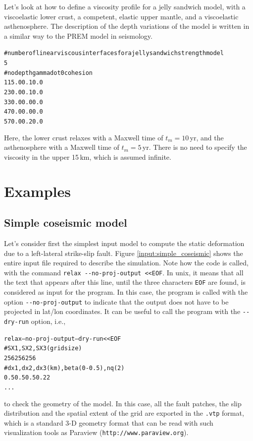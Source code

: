 \documentclass[10pt]{article}
\begin{document}
Let's look at how to define a viscosity profile for a jelly sandwich model, with a viscoelastic lower crust, a competent, elastic upper mantle, and a viscoelastic asthenosphere. The description of the depth variations of the model is written in a similar way to the PREM model in seismology.
\begin{alltt}
# number of linear viscous interfaces for a jelly sandwich strength model
{\color{orange}5}
# no depth gammadot0 cohesion
{\color{orange}   1  15.0       0.1      0.0}
{\color{orange}   2  30.0       0.1      0.0}
{\color{orange}   3  30.0       0.0      0.0}
{\color{orange}   4  70.0       0.0      0.0}
{\color{orange}   5  70.0       0.2      0.0}
\end{alltt}
Here, the lower crust relaxes with a Maxwell time of $t_m=10\,$yr, and the asthenosphere with a Maxwell time of $t_m=5\,$yr. There is no need to specify the viscosity in the upper 15\,km, which is assumed infinite.


\section{Examples}

\subsection{Simple coseismic model}

Let's consider first the simplest input model to compute the static deformation due to a left-lateral strike-slip fault. Figure \ref{input:simple_coseismic} shows the entire input file required to describe the simulation. Note how the code is called, with the command \verb'relax --no-proj-output <<EOF'. In unix, it means that all the text that appears after this line, until the three characters \verb'EOF' are found, is considered as input for the program. In this case, the program is called with the option \verb'--no-proj-output' to indicate that the output does not have to be projected in lat/lon coordinates. It can be useful to call the program with the \verb'--dry-run' option, i.e.,
\begin{alltt}
relax --no-proj-output {\color{orange}--dry-run} <<EOF
# SX1,SX2,SX3 (grid size)
256 256 256
# dx1,dx2,dx3 (km),beta (0-0.5),nq (2)
0.5 0.5 0.5 0.2 2
...
\end{alltt}
to check the geometry of the model. In this case, all the fault patches, the slip distribution and the spatial extent of the grid are exported in the \verb'.vtp' format, which is a standard 3-D geometry format that can be read with such visualization tools as Paraview (\verb'http://www.paraview.org').
\end{document}
